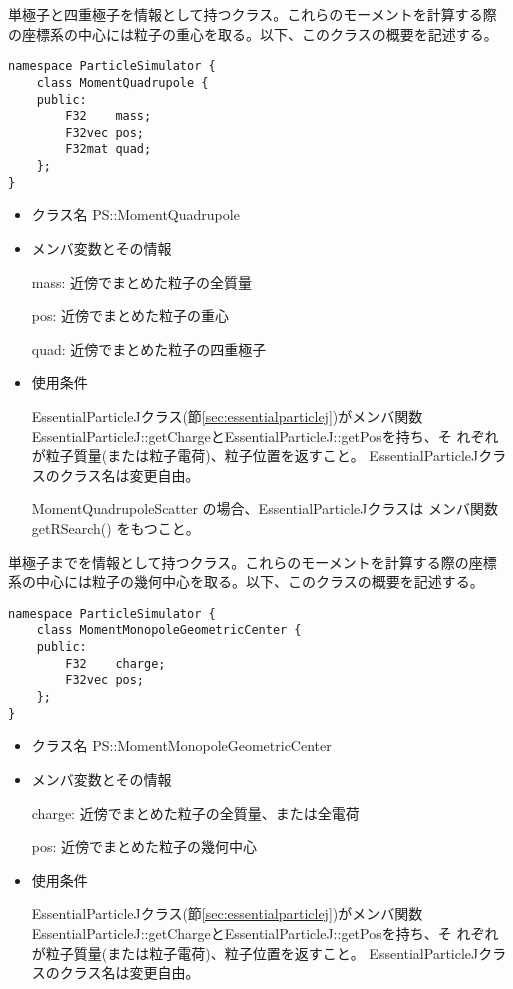 
単極子と四重極子を情報として持つクラス。これらのモーメントを計算する際
の座標系の中心には粒子の重心を取る。以下、このクラスの概要を記述する。
\begin{screen}
\begin{verbatim}
namespace ParticleSimulator {
    class MomentQuadrupole {
    public:
        F32    mass;    
        F32vec pos;
        F32mat quad;
    };
}
\end{verbatim}
\end{screen}

\begin{itemize}
\item クラス名
  PS::MomentQuadrupole

\item メンバ変数とその情報

  mass: 近傍でまとめた粒子の全質量

  pos: 近傍でまとめた粒子の重心

  quad: 近傍でまとめた粒子の四重極子

\item 使用条件

  EssentialParticleJクラス(節\ref{sec:essentialparticlej})がメンバ関数
  EssentialParticleJ::getChargeとEssentialParticleJ::getPosを持ち、そ
  れぞれが粒子質量(または粒子電荷)、粒子位置を返すこと。
  EssentialParticleJクラスのクラス名は変更自由。

  MomentQuadrupoleScatter の場合、EssentialParticleJクラスは
  メンバ関数 getRSearch() をもつこと。
  
\end{itemize}


単極子までを情報として持つクラス。これらのモーメントを計算する際の座標
系の中心には粒子の幾何中心を取る。以下、このクラスの概要を記述する。
\begin{screen}
\begin{verbatim}
namespace ParticleSimulator {
    class MomentMonopoleGeometricCenter {
    public:
        F32    charge;    
        F32vec pos;
    };
}
\end{verbatim}
\end{screen}

\begin{itemize}
\item クラス名
  PS::MomentMonopoleGeometricCenter

\item メンバ変数とその情報

  charge: 近傍でまとめた粒子の全質量、または全電荷

  pos: 近傍でまとめた粒子の幾何中心

\item 使用条件

  EssentialParticleJクラス(節\ref{sec:essentialparticlej})がメンバ関数
  EssentialParticleJ::getChargeとEssentialParticleJ::getPosを持ち、そ
  れぞれが粒子質量(または粒子電荷)、粒子位置を返すこと。
  EssentialParticleJクラスのクラス名は変更自由。

\end{itemize}

